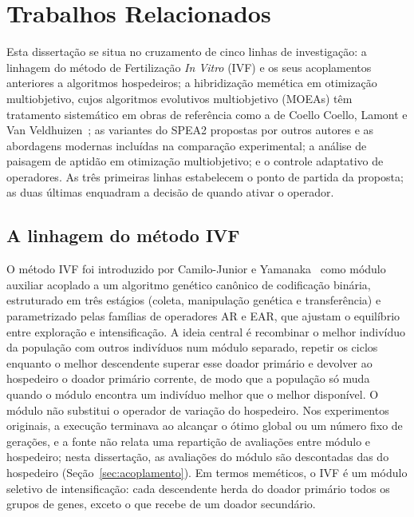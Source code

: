 \chapter{Trabalhos Relacionados}
\label{sec:RW}

Esta dissertação se situa no cruzamento de cinco linhas de investigação: a linhagem do método de Fertilização \textit{In Vitro} (IVF) e os seus acoplamentos anteriores a algoritmos hospedeiros; a hibridização memética em otimização multiobjetivo, cujos algoritmos evolutivos multiobjetivo (MOEAs) têm tratamento sistemático em obras de referência como a de Coello Coello, Lamont e Van Veldhuizen~\cite{coello2007evolutionary}; as variantes do SPEA2 propostas por outros autores e as abordagens modernas incluídas na comparação experimental; a análise de paisagem de aptidão em otimização multiobjetivo; e o controle adaptativo de operadores. As três primeiras linhas estabelecem o ponto de partida da proposta; as duas últimas enquadram a decisão de quando ativar o operador.

\section{A linhagem do método IVF}
\label{sec:linhagem_ivf}

O método IVF foi introduzido por Camilo-Junior e Yamanaka~\cite{camilo-junior2011} como módulo auxiliar acoplado a um algoritmo genético canônico de codificação binária, estruturado em três estágios (coleta, manipulação genética e transferência) e parametrizado pelas famílias de operadores AR e EAR, que ajustam o equilíbrio entre exploração e intensificação. A ideia central é recombinar o melhor indivíduo da população com outros indivíduos num módulo separado, repetir os ciclos enquanto o melhor descendente superar esse doador primário e devolver ao hospedeiro o doador primário corrente, de modo que a população só muda quando o módulo encontra um indivíduo melhor que o melhor disponível. O módulo não substitui o operador de variação do hospedeiro. Nos experimentos originais, a execução terminava ao alcançar o ótimo global ou um número fixo de gerações, e a fonte não relata uma repartição de avaliações entre módulo e hospedeiro; nesta dissertação, as avaliações do módulo são descontadas das do hospedeiro (Seção~\ref{sec:acoplamento}). Em termos meméticos, o IVF é um módulo seletivo de intensificação: cada descendente herda do doador primário todos os grupos de genes, exceto o que recebe de um doador secundário.

